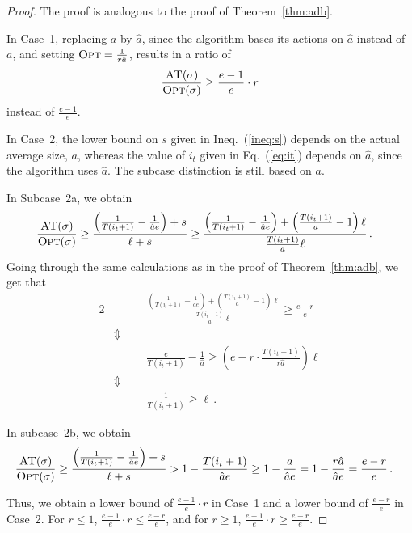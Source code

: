 \documentclass[a4paper,UKenglish,cleveref, autoref, thm-restate]{lipics-v2021}
\newcommand{\OPT}{\ensuremath{\operatorname{\textsc{Opt}}}\xspace}
\newcommand{\ADB}{\ensuremath{\operatorname{\textsc{AT}}}\xspace}
\newcommand{\TF}{T}
\newcommand{\guess}{\ensuremath{\hat{a}}\xspace}
\begin{document}
\begin{proof}
The proof is analogous to the proof of Theorem~\ref{thm:adb}.

In Case~1, replacing $a$ by \guess, since the algorithm bases its actions on \guess
instead of $a$, and setting $\OPT =
\frac{1}{r\guess}$, results in a ratio of
$$\frac{\ADB(\sigma)}{\OPT(\sigma)} \geq \frac{e-1}{e} \cdot r$$ 
instead of $\frac{e-1}{e}$.

In Case~2, the lower bound on $s$ given in Ineq.~(\ref{ineq:s}) depends on
the actual average size, $a$, whereas the value of $i_t$ given
in Eq.~(\ref{eq:it}) depends on \guess, since the algorithm uses \guess.
The subcase distinction is still based on $a$.

In Subcase~2a, we obtain
\begin{align*}
  \frac{\ADB(\sigma)}{\OPT(\sigma)}
  & \geq 
  \frac{\left(\frac{1}{\TF(i_t+1)}-\frac{1}{\guess e}\right) + s}{\ell+s}
  \geq 
  \frac{\left(\frac{1}{\TF(i_t+1)}-\frac{1}{\guess e}\right) + \left(\frac{\TF(i_t+1)}{a}-1\right)\ell}{\frac{\TF(i_t+1)}{a}\ell}\,.
\end{align*}
Going through the same calculations as in the proof of
Theorem~\ref{thm:adb}, we get that 
\begin{alignat*}{2}
&&& \frac{\left(\frac{1}{\TF(i_t+1)}-\frac{1}{\guess e}\right) +
    \left(\frac{\TF(i_t+1)}{a}-1\right)\ell}{\frac{\TF(i_t+1)}{a}\ell}  \geq \frac{e-r}{e} \\
&\Updownarrow~~~ && \\
&&&  \frac{e}{\TF(i_t+1)} - \frac{1}{\guess}
  \geq  \left(e - r \cdot \frac{\TF(i_t+1)}{r \guess}\right)\ell \\
&\Updownarrow~~~ && \\
&&&  \frac{1}{\TF(i_t+1)} \geq \ell \,.
\end{alignat*}

In subcase~2b, we obtain
\begin{align*}
  \frac{\ADB(\sigma)}{\OPT(\sigma)}
  & \geq
  \frac{\left(\frac{1}{\TF(i_t+1)}-\frac{1}{\guess e}\right) + s}{\ell+s}
    > 1 - \frac{\TF(i_t+1)}{\guess e} 
   \geq  1 - \frac{a}{\guess e}
   = 1 - \frac{r \guess}{\guess e}
   = \frac{e-r}{e}\,.
\end{align*}

Thus, we obtain a lower bound of $\frac{e-1}{e} \cdot r$ in Case~1 and
a lower bound of $\frac{e-r}{e}$ in Case~2.
For $r \leq 1$, $\frac{e-1}{e} \cdot r \leq \frac{e-r}{e}$, and for $r \geq 1$, $\frac{e-1}{e} \cdot r \geq \frac{e-r}{e}$.
\end{proof}
\end{document}
